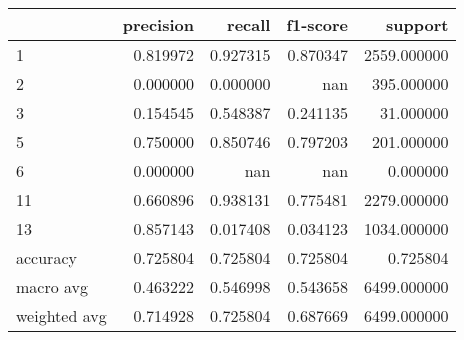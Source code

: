 \begin{tabular}{lrrrr}
\toprule
 & precision & recall & f1-score & support \\
\midrule
1 & 0.819972 & 0.927315 & 0.870347 & 2559.000000 \\
2 & 0.000000 & 0.000000 & nan & 395.000000 \\
3 & 0.154545 & 0.548387 & 0.241135 & 31.000000 \\
5 & 0.750000 & 0.850746 & 0.797203 & 201.000000 \\
6 & 0.000000 & nan & nan & 0.000000 \\
11 & 0.660896 & 0.938131 & 0.775481 & 2279.000000 \\
13 & 0.857143 & 0.017408 & 0.034123 & 1034.000000 \\
accuracy & 0.725804 & 0.725804 & 0.725804 & 0.725804 \\
macro avg & 0.463222 & 0.546998 & 0.543658 & 6499.000000 \\
weighted avg & 0.714928 & 0.725804 & 0.687669 & 6499.000000 \\
\bottomrule
\end{tabular}
